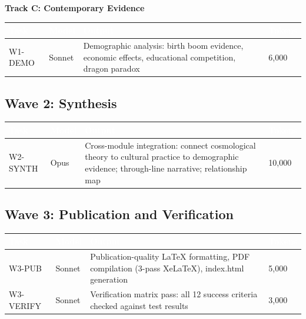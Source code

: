 \documentclass[11pt,letterpaper]{article}
\newcommand{\tableheader}[1]{\textbf{\sffamily\textcolor{white}{#1}}}
\begin{document}
\textbf{Track C: Contemporary Evidence}

\begin{center}
\begin{tabularx}{\textwidth}{L{2.5cm}L{1.5cm}XC{1.5cm}}
\toprule
{}
\tableheader{Task} & \tableheader{Model} & \tableheader{Output} & \tableheader{Tokens} \\
\midrule
W1-DEMO & Sonnet & Demographic analysis: birth boom evidence, economic effects, educational competition, dragon paradox & 6,000 \\
\bottomrule
\end{tabularx}
\end{center}

\subsection{Wave 2: Synthesis}

\begin{center}
\begin{tabularx}{\textwidth}{L{2.5cm}L{1.5cm}XC{1.5cm}}
\toprule
{}
\tableheader{Task} & \tableheader{Model} & \tableheader{Output} & \tableheader{Tokens} \\
\midrule
W2-SYNTH & Opus & Cross-module integration: connect cosmological theory to cultural practice to demographic evidence; through-line narrative; relationship map & 10,000 \\
\bottomrule
\end{tabularx}
\end{center}

\subsection{Wave 3: Publication and Verification}

\begin{center}
\begin{tabularx}{\textwidth}{L{2.5cm}L{1.5cm}XC{1.5cm}}
\toprule
{}
\tableheader{Task} & \tableheader{Model} & \tableheader{Output} & \tableheader{Tokens} \\
\midrule
W3-PUB & Sonnet & Publication-quality LaTeX formatting, PDF compilation (3-pass XeLaTeX), index.html generation & 5,000 \\
W3-VERIFY & Sonnet & Verification matrix pass: all 12 success criteria checked against test results & 3,000 \\
\bottomrule
\end{tabularx}
\end{center}
\end{document}
